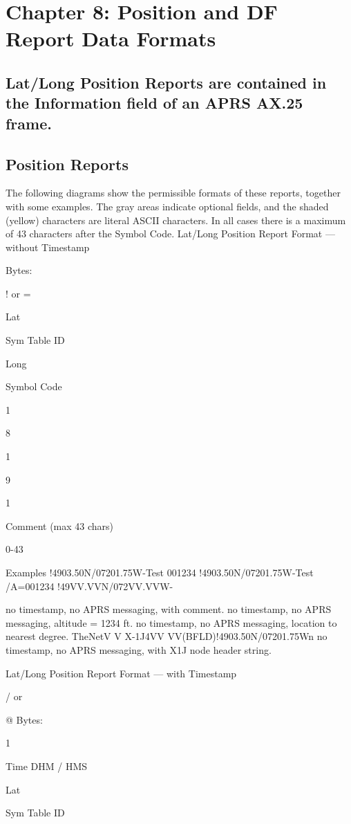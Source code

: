 \chapter{Chapter 8: Position and DF Report Data Formats}


\section{Lat/Long Position Reports are contained in the Information field of an APRS AX.25 frame.}

\section{Position Reports}

The following diagrams show the permissible formats of these reports,
together with some examples. The gray areas indicate optional fields, and the
shaded (yellow) characters are literal ASCII characters. In all cases there is a
maximum of 43 characters after the Symbol Code.
Lat/Long Position Report Format — without Timestamp

Bytes:

! or
=

Lat

Sym
Table
ID

Long

Symbol
Code

1

8

1

9

1

Comment
(max 43 chars)

0-43

Examples
!4903.50N/07201.75W-Test 001234
!4903.50N/07201.75W-Test /A=001234
!49VV.VVN/072VV.VVW-

no timestamp, no APRS messaging, with comment.
no timestamp, no APRS messaging, altitude = 1234 ft.
no timestamp, no APRS messaging, location to
nearest degree.
TheNetV
V X-1J4VV
VV(BFLD)!4903.50N/07201.75Wn no timestamp, no APRS messaging,
with X1J node header string.

Lat/Long Position Report Format — with Timestamp

/ or

@
Bytes:

1

Time
DHM /
HMS

Lat

Sym
Table
ID

